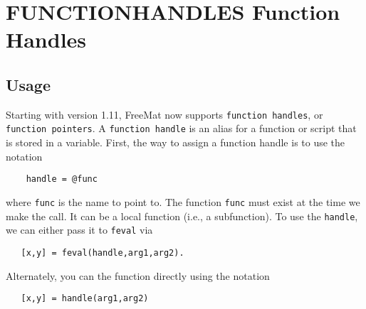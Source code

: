 \section{FUNCTIONHANDLES Function Handles}

\subsection{Usage}

Starting with version 1.11, FreeMat now supports \verb|function handles|,
or \verb|function pointers|.  A \verb|function handle| is an alias for a function
or script that is stored in a variable.  First, the way to assign
a function handle is to use the notation
\begin{verbatim}
    handle = @func
\end{verbatim}
where \verb|func| is the name to point to.  The function \verb|func| must exist
at the time we make the call.  It can be a local function (i.e., a
subfunction).  To use the \verb|handle|, we can either pass it to \verb|feval|
via
\begin{verbatim}
   [x,y] = feval(handle,arg1,arg2).
\end{verbatim}
Alternately, you can the function directly using the notation
\begin{verbatim}
   [x,y] = handle(arg1,arg2)
\end{verbatim}

